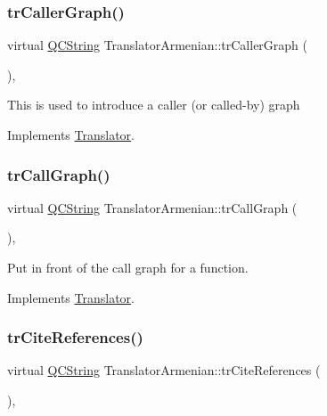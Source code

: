 \subsubsection{\texorpdfstring{trCallerGraph()}{trCallerGraph()}}
{\footnotesize\ttfamily virtual \mbox{\hyperlink{class_q_c_string}{Q\+C\+String}} Translator\+Armenian\+::tr\+Caller\+Graph (\begin{DoxyParamCaption}{ }\end{DoxyParamCaption})\hspace{0.3cm}{\ttfamily [inline]}, {\ttfamily [virtual]}}

This is used to introduce a caller (or called-\/by) graph 

Implements \mbox{\hyperlink{class_translator}{Translator}}.

\mbox{\label{class_translator_armenian_a36138c3f78e896302cceda774bc75e18}} 
\subsubsection{\texorpdfstring{trCallGraph()}{trCallGraph()}}
{\footnotesize\ttfamily virtual \mbox{\hyperlink{class_q_c_string}{Q\+C\+String}} Translator\+Armenian\+::tr\+Call\+Graph (\begin{DoxyParamCaption}{ }\end{DoxyParamCaption})\hspace{0.3cm}{\ttfamily [inline]}, {\ttfamily [virtual]}}

Put in front of the call graph for a function. 

Implements \mbox{\hyperlink{class_translator}{Translator}}.

\mbox{\label{class_translator_armenian_a26da4084271759771361792d43a91d11}} 
\subsubsection{\texorpdfstring{trCiteReferences()}{trCiteReferences()}}
{\footnotesize\ttfamily virtual \mbox{\hyperlink{class_q_c_string}{Q\+C\+String}} Translator\+Armenian\+::tr\+Cite\+References (\begin{DoxyParamCaption}{ }\end{DoxyParamCaption})\hspace{0.3cm}{\ttfamily [inline]}, {\ttfamily [virtual]}}

